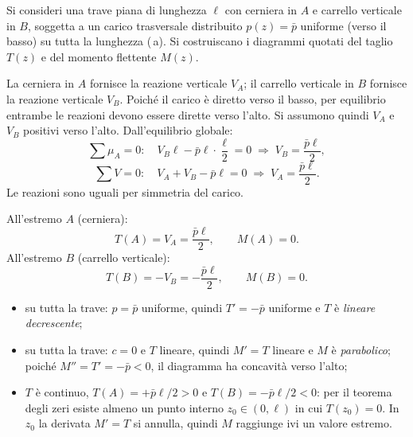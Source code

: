 \begin{esempio}
	Si consideri una trave piana di lunghezza $\ell$
	con cerniera in $A$ e carrello verticale in $B$,
	soggetta a un carico trasversale distribuito
	$p(z) = \bar{p}$ uniforme (verso il basso) su
	tutta la lunghezza (\,a).
	Si costruiscano i diagrammi quotati del taglio $T(z)$
	e del momento flettente $M(z)$.
	
	\begin{svolgimento}
		
		



		
		
		La cerniera in $A$ fornisce la reazione
		verticale $V_A$; il carrello verticale in $B$
		fornisce la reazione verticale $V_B$.
		Poiché il carico è diretto verso il basso,
		per equilibrio entrambe le reazioni devono
		essere dirette verso l'alto.
		Si assumono quindi $V_A$ e $V_B$ positivi
		verso l'alto.
		Dall'equilibrio globale:
		\[
		\sum \mu_A = 0:\quad
		V_B\ell - \bar{p}\ell\cdot\frac{\ell}{2} = 0
		\;\Rightarrow\;
		V_B = \frac{\bar{p}\ell}{2},
		\]
		\[
		\sum V = 0:\quad
		V_A + V_B - \bar{p}\ell = 0
		\;\Rightarrow\;
		V_A = \frac{\bar{p}\ell}{2}.
		\]
		Le reazioni sono uguali per simmetria del carico.
		
		All'estremo $A$ (cerniera):
		\[
		T(A) = V_A = \frac{\bar{p}\ell}{2}, \qquad
		M(A) = 0.
		\]
		All'estremo $B$ (carrello verticale):
		\[
		T(B) = -V_B = -\frac{\bar{p}\ell}{2}, \qquad
		M(B) = 0.
		\]
		
		\begin{itemize}[nosep]
			\item su tutta la trave: $p = \bar{p}$
			uniforme, quindi $T' = -\bar{p}$
			uniforme e $T$ è \emph{lineare
				decrescente};
			\item su tutta la trave: $c = 0$ e $T$
			lineare, quindi $M' = T$ lineare
			e $M$ è \emph{parabolico}; poiché
			$M'' = T' = -\bar{p} < 0$, il
			diagramma ha concavità verso l'alto;
			\item $T$ è continuo, $T(A) = +\bar{p}\ell/2 > 0$
			e $T(B) = -\bar{p}\ell/2 < 0$: per il
			teorema degli zeri esiste almeno un punto
			interno $z_0 \in (0,\ell)$ in cui $T(z_0) = 0$.
			In $z_0$ la derivata $M' = T$ si annulla,
			quindi $M$ raggiunge ivi un valore estremo.
		\end{itemize}
		

\end{svolgimento}
\end{esempio}
